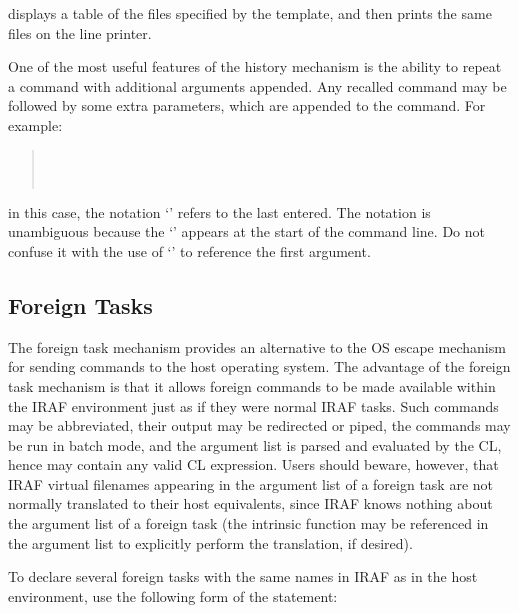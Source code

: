 \noindent
displays a table of the files specified by the template, and then prints
the same files on the line printer.

One of the most useful features of the history mechanism is the ability to
repeat a command with additional arguments appended.  Any recalled command
may be followed by some extra parameters, which are appended to the command.
For example:

\begin{quotation}\noindent
{}  \\
  \\
\end{quotation}

\noindent
in this case, the notation `\upa\upa' refers to the last 
 entered.
The notation is unambiguous because the `\upa\upa' appears at the start of
the command line.  Do not confuse it with the use of `\upa\upa' to reference
the first argument.

\subsection{Foreign Tasks}

\ppind
The foreign task mechanism provides an alternative to the OS escape mechanism
for sending commands to the host operating system.  The advantage of the
foreign task mechanism is that it allows foreign commands to be made available
within the IRAF environment just as if they were normal IRAF tasks.
Such commands may be abbreviated, their output may be redirected or piped,
the commands may be run in batch mode, and the argument list is parsed and
evaluated by the CL, hence may contain any valid CL expression.  Users should
beware, however, that IRAF virtual filenames appearing in the argument list
of a foreign task are not normally translated to their host equivalents, since
IRAF knows nothing about the argument list of a foreign task
(the  intrinsic function may be referenced in the argument
list to explicitly perform the translation, if desired).

To declare several foreign tasks with the same names in IRAF as in the host
environment, use the following form of the  statement:

\begin{quotation}\noindent
{} 
\end{quotation}

